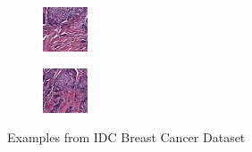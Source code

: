 \begin{figure}[h]
\begin{subfigure}[b]{.2\linewidth}
\end{subfigure}
\begin{subfigure}[b]{.2\linewidth}
\includegraphics[width=\linewidth]{Figs/8864_idx5_x1801_y2651_class1.png}
\end{subfigure}
\begin{subfigure}[b]{.2\linewidth}
\includegraphics[width=\linewidth]{Figs/8864_idx5_x1801_y2551_class1.png}
\end{subfigure}
\caption{Examples from IDC Breast Cancer Dataset}
\label{IDC}
\end{figure}

